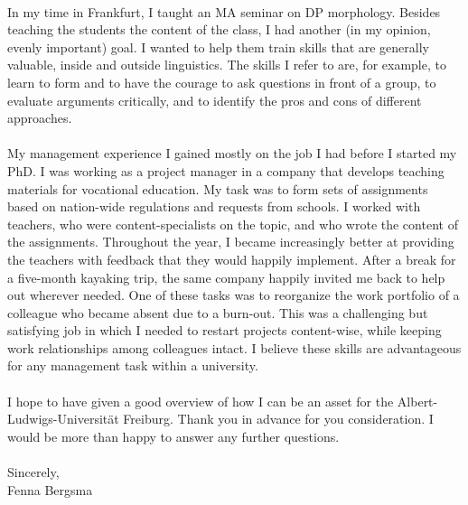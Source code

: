 \documentclass[12pt]{article}
\begin{document}
\phantom{x}\\

In my time in Frankfurt, I taught an MA seminar on DP morphology. Besides teaching the students the content of the class, I had another (in my opinion, evenly important) goal. I wanted to help them train skills that are generally valuable, inside and outside linguistics. The skills I refer to are, for example, to learn to form and to have the courage to ask questions in front of a group, to evaluate arguments critically, and to identify the pros and cons of different approaches.\\

\phantom{x}\\

My management experience I gained mostly on the job I had before I started my PhD. I was working as a project manager in a company that develops teaching materials for vocational education. My task was to form sets of assignments based on nation-wide regulations and requests from schools. I worked with teachers, who were content-specialists on the topic, and who wrote the content of the assignments. Throughout the year, I became increasingly better at providing the teachers with feedback that they would happily implement. After a break for a five-month kayaking trip, the same company happily invited me back to help out wherever needed. One of these tasks was to reorganize the work portfolio of a colleague who became absent due to a burn-out. This was a challenging but satisfying job in which I needed to restart projects content-wise, while keeping work relationships among colleagues intact. I believe these skills are advantageous for any management task within a university.\\




\phantom{x}\\

I hope to have given a good overview of how I can be an asset for the Albert-Ludwigs-Universität Freiburg. Thank you in advance for you consideration. I would be more than happy to answer any further questions.\\

\phantom{x}\\



Sincerely,\\
Fenna Bergsma
\end{document}
